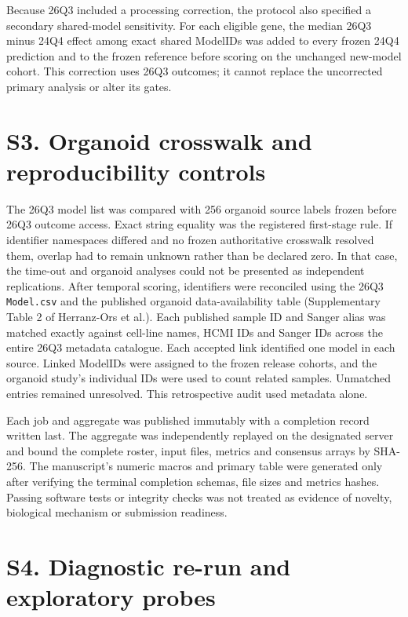 \documentclass[11pt]{article}
\begin{document}
Because 26Q3 included a processing correction, the protocol also specified a
secondary shared-model sensitivity. For each eligible gene, the median 26Q3
minus 24Q4 effect among exact shared ModelIDs was added to every frozen 24Q4
prediction and to the frozen reference before scoring on the unchanged new-model
cohort. This correction uses 26Q3 outcomes; it cannot replace the uncorrected
primary analysis or alter its gates.

\section*{S3. Organoid crosswalk and reproducibility controls}

The 26Q3 model list was compared with 256 organoid source labels frozen before
26Q3 outcome access. Exact string equality was the registered first-stage rule.
If identifier namespaces differed and no frozen authoritative crosswalk resolved
them, overlap had to remain unknown rather than be declared zero. In that case,
the time-out and organoid analyses could not be presented as independent
replications. After temporal scoring, identifiers were reconciled using the
26Q3 \texttt{Model.csv} and the published organoid data-availability table
(Supplementary Table 2 of Herranz-Ors et al.). Each published sample ID and
Sanger alias was matched exactly against cell-line names, HCMI IDs and Sanger
IDs across the entire 26Q3 metadata catalogue. Each accepted link identified one
model in each source. Linked ModelIDs were assigned to the frozen release
cohorts, and the organoid study's individual IDs were used to count related
samples. Unmatched entries remained unresolved. This retrospective audit used
metadata alone.

Each job and aggregate was published immutably with a completion record written
last. The aggregate was independently replayed on the designated server and
bound the complete roster, input files, metrics and consensus arrays by SHA-256.
The manuscript's numeric macros and primary table were generated only after
verifying the terminal completion schemas, file sizes and metrics hashes. Passing
software tests or integrity checks was not treated as evidence of novelty,
biological mechanism or submission readiness.

\section*{S4. Diagnostic re-run and exploratory probes}
\end{document}
